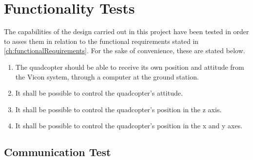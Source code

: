 \chapter{Functionality Tests}
The capabilities of the design carried out in this project have been tested in order to asses them in relation to the functional requirements stated in \autoref{ch:functionalRequirements}. 
For the sake of convenience, these are stated below.
\begin{enumerate}[label=\textbf{\arabic*})]
\item {The quadcopter should be able to receive its own position and attitude from the Vicon system, through a computer at the ground station.}
\item {It shall be possible to control the quadcopter's attitude.}
\item {It shall be possible to control the quadcopter's position in the z axis.}
\item {It shall be possible to control the quadcopter's position in the x and y axes.}
\end{enumerate}
\section{Communication Test}\label{sec:NetworkTest}


